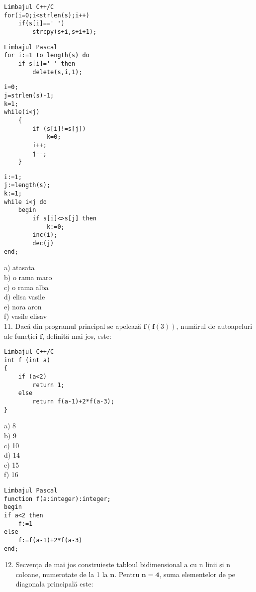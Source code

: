\begin{verbatim}
Limbajul C++/C
for(i=0;i<strlen(s);i++)
    if(s[i]==' ')
        strcpy(s+i,s+i+1);
\end{verbatim}

\begin{verbatim}
Limbajul Pascal
for i:=1 to length(s) do
    if s[i]=' ' then
        delete(s,i,1);
\end{verbatim}

\begin{verbatim}
i=0;
j=strlen(s)-1;
k=1;
while(i<j)
    {
        if (s[i]!=s[j])
            k=0;
        i++;
        j--;
    }
\end{verbatim}

\begin{verbatim}
i:=1;
j:=length(s);
k:=1;
while i<j do
    begin
        if s[i]<>s[j] then
            k:=0;
        inc(i);
        dec(j)
end;
\end{verbatim}

a) atasata\\
b) o rama maro\\
c) o rama alba\\
d) elisa vasile\\
e) nora aron\\
f) vasile elisav\\
11. Dacă din programul principal se apelează $\mathbf{f}(\mathbf{f}(3))$, numărul de autoapeluri ale funcției $\mathbf{f}$, definită mai jos, este:

\begin{verbatim}
Limbajul C++/C
int f (int a)
{
    if (a<2)
        return 1;
    else
        return f(a-1)+2*f(a-3);
}
\end{verbatim}

a) 8\\
b) 9\\
c) 10\\
d) 14\\
e) 15\\
f) 16

\begin{verbatim}
Limbajul Pascal
function f(a:integer):integer;
begin
if a<2 then
    f:=1
else
    f:=f(a-1)+2*f(a-3)
end;
\end{verbatim}

\begin{enumerate}
  \setcounter{enumi}{11}
  \item Secvența de mai jos construiește tabloul bidimensional a cu n linii și n coloane, numerotate de la 1 la $\mathbf{n}$. Pentru $\mathbf{n = 4}$, suma elementelor de pe diagonala principală este:
\end{enumerate}

